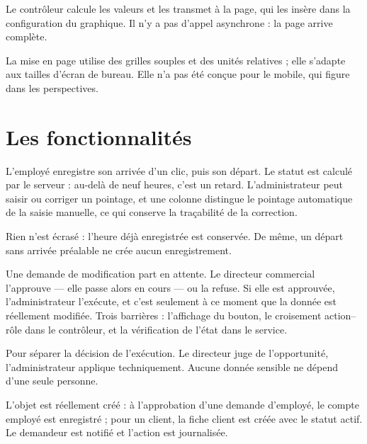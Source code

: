 \documentclass[a4paper,11pt]{article}
\begin{document}
Le contrôleur calcule les valeurs et les transmet à la page, qui les insère dans
la configuration du graphique. Il n'y a pas d'appel asynchrone : la page arrive
complète.

La mise en page utilise des grilles souples et des unités relatives ; elle
s'adapte aux tailles d'écran de bureau. Elle n'a pas été conçue pour le mobile,
qui figure dans les perspectives.

\section{Les fonctionnalités}

L'employé enregistre son arrivée d'un clic, puis son départ. Le statut est
calculé par le serveur : au-delà de neuf heures, c'est un retard. L'administrateur
peut saisir ou corriger un pointage, et une colonne distingue le pointage
automatique de la saisie manuelle, ce qui conserve la traçabilité de la
correction.

Rien n'est écrasé : l'heure déjà enregistrée est conservée. De même, un départ
sans arrivée préalable ne crée aucun enregistrement.

Une demande de modification part en attente. Le directeur commercial l'approuve
--- elle passe alors en cours --- ou la refuse. Si elle est approuvée,
l'administrateur l'exécute, et c'est seulement à ce moment que la donnée est
réellement modifiée. Trois barrières : l'affichage du bouton, le croisement
action--rôle dans le contrôleur, et la vérification de l'état dans le service.

Pour séparer la décision de l'exécution. Le directeur juge de l'opportunité,
l'administrateur applique techniquement. Aucune donnée sensible ne dépend d'une
seule personne.

L'objet est réellement créé : à l'approbation d'une demande d'employé, le compte
employé est enregistré ; pour un client, la fiche client est créée avec le
statut actif. Le demandeur est notifié et l'action est journalisée.
\end{document}
